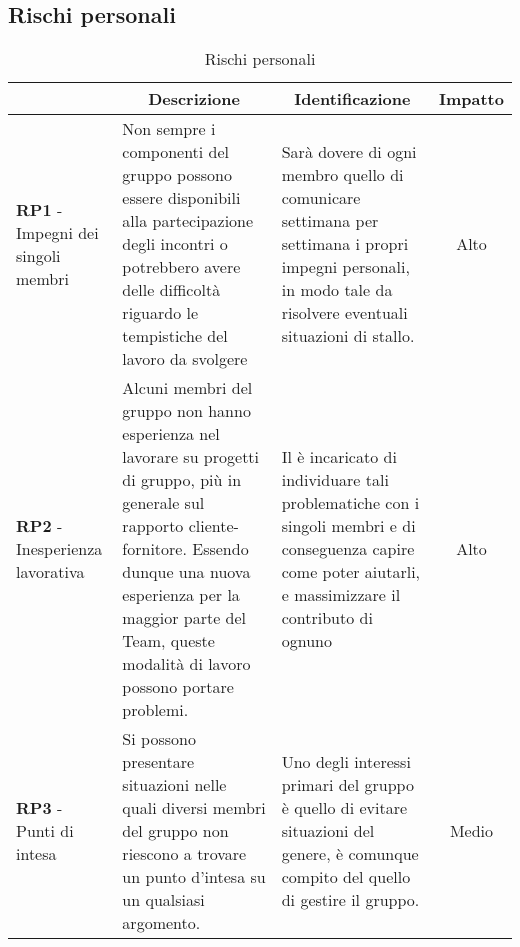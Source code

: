\subsection{Rischi personali} \label{subsection:rischi_personali}
\begin{table}[H]
    \centering
    \renewcommand{\arraystretch}{1.8}
    \begin{tabular}{p{5.5cm}|p{5cm}|p{5cm}|c}
        \rowcolor[HTML]{1F85DE}
        \multicolumn{1}{c}{\color[HTML]{FFFFFF}\textbf{Codice}}
        & \multicolumn{1}{c}{\color[HTML]{FFFFFF}\textbf{Descrizione}}
        & \multicolumn{1}{c}{\color[HTML]{FFFFFF}\textbf{Identificazione}}
        & \color[HTML]{FFFFFF}\textbf{Impatto}\\
        \hline
        \textbf{RP1} - Impegni dei singoli membri & Non sempre i componenti del gruppo possono essere disponibili alla partecipazione degli incontri o potrebbero avere delle difficoltà riguardo le tempistiche del lavoro da svolgere & Sarà dovere di ogni membro quello di comunicare settimana per settimana i propri impegni personali, in modo tale da risolvere eventuali situazioni di stallo. & Alto\\
        \textbf{RP2} - Inesperienza lavorativa & Alcuni membri del gruppo non hanno esperienza nel lavorare su progetti di gruppo, più in generale sul rapporto cliente-fornitore. Essendo dunque una nuova esperienza per la maggior parte del Team, queste modalità di lavoro possono portare problemi. & Il \roleProjectManagerLow{} è incaricato di individuare tali problematiche con i singoli membri e di conseguenza capire come poter aiutarli, e massimizzare il contributo di ognuno & Alto  \\
        \textbf{RP3} - Punti di intesa & Si possono presentare situazioni nelle quali diversi membri del gruppo non riescono a trovare un punto d'intesa su un qualsiasi argomento. &  Uno degli interessi primari del gruppo è quello di evitare situazioni del genere, è comunque compito del \roleProjectManagerLow{} quello di gestire il gruppo. & Medio\\
    \end{tabular}
  \caption{Rischi personali}
\end{table}


